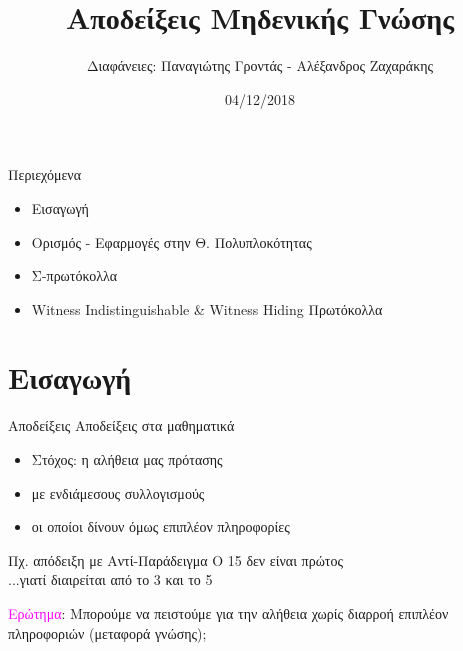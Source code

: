 \documentclass[10pt,handout]{beamer}
\title{Αποδείξεις Μηδενικής Γνώσης}
\author{Διαφάνειες: Παναγιώτης Γροντάς - Αλέξανδρος Ζαχαράκης}
\date{04/12/2018}
\institute{ΕΜΠ - Κρυπτογραφία (2018-2019)}
\begin{document}
\newcommand{\xor}{ \oplus }
\newcommand{\msg}{ \mathtt{M} }
\newcommand{\KEY}{ \mathtt{K} }
\newcommand{\CPH}{ \mathtt{C} }
\newcommand{\keygen}{\mathtt{KeyGen}}
\newcommand{\enc}{\mathtt{Encrypt}}
\newcommand{\dec}{\mathtt{Decrypt}}
\newcommand{\sign}{\mathtt{Sign}}
\newcommand{\verify}{\mathtt{Verify}}
\newcommand{\adv}{$\mathcal{A}$}
\newcommand{\Hash}{\mathcal{H} }
\newcommand{\advb}{$\mathcal{B}$}
\newcommand{\chal}{$\mathcal{C}$}
\newcommand{\cs}{$\mathcal{CS}$}
\newcommand{\Zed}{\mathbb{Z}} 
\newcommand{\zns}{\mathbb{Z}^*_n}
\newcommand{\zs}[1]{\mathbb{Z}^*_{#1}}
\newcommand{\prv}{\ensuremath \mathcal{P}\,}
\newcommand{\ver}{\ensuremath \mathcal{V}\,}
\newcommand{\siml}{$\mathcal{S}\,$}
\newcommand{\green}[1]{\textcolor{teal}{#1}}
\newcommand{\Green}[1]{\textcolor{Teal}{#1}}
\newcommand{\ForestGreen}[1]{\textcolor{ForestGreen}{#1}}
\newcommand{\blue}[1]{\textcolor{blue}{#1}}
\newcommand{\magenta}[1]{\textcolor{magenta}{#1}}
\newcommand{\cyan}[1]{\textcolor{cyan}{#1}}

\newcommand{\twopartdef}[4]
{ 
		\begin{cases}
			#1 , #2 \\
			#3 , #4
		\end{cases} 
}
\begin{frame}
\titlepage
\end{frame}

\begin{frame}{Περιεχόμενα}
\begin{itemize}
\item Εισαγωγή
\item Ορισμός - Εφαρμογές στην Θ. Πολυπλοκότητας
\item Σ-πρωτόκολλα
\item Witness Indistinguishable \& Witness Hiding Πρωτόκολλα
\end{itemize}
\end{frame}

\section{Εισαγωγή}
\begin{frame}{Αποδείξεις}
Αποδείξεις στα μαθηματικά
\pause
\begin{itemize}
\item Στόχος: η αλήθεια μας πρότασης
\pause
\item με ενδιάμεσους συλλογισμούς
\pause
\item οι οποίοι δίνουν όμως επιπλέον πληροφορίες
\pause
\end{itemize}
\begin{block}{Πχ. απόδειξη με Αντί-Παράδειγμα}
O 15 δεν είναι πρώτος \\
\pause
...γιατί διαιρείται από το 3 και το 5
\end{block}
\pause
\magenta{Ερώτημα}: Μπορούμε να πειστούμε για την αλήθεια χωρίς διαρροή επιπλέον πληροφοριών (μεταφορά γνώσης);
\end{frame}
\end{document}

